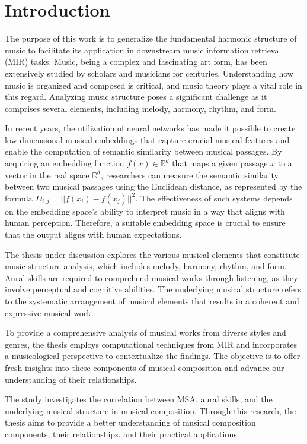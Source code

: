 \chapter{Introduction}

The purpose of this work is to generalize the fundamental harmonic structure of music to facilitate its application in downstream music information retrieval (MIR) tasks. Music, being a complex and fascinating art form, has been extensively studied by scholars and musicians for centuries. Understanding how music is organized and composed is critical, and music theory plays a vital role in this regard. Analyzing music structure poses a significant challenge as it comprises several elements, including melody, harmony, rhythm, and form.

In recent years, the utilization of neural networks has made it possible to create low-dimensional musical embeddings that capture crucial musical features and enable the computation of semantic similarity between musical passages. By acquiring an embedding function $f(x) \in \mathbb{R}^d$ that maps a given passage $x$ to a vector in the real space $\mathbb{R}^d$, researchers can measure the semantic similarity between two musical passages using the Euclidean distance, as represented by the formula $D_{i,j} = ||f(x_i) - f(x_j)||^2$. The effectiveness of such systems depends on the embedding space's ability to interpret music in a way that aligns with human perception. Therefore, a suitable embedding space is crucial to ensure that the output aligns with human expectations.

The thesis under discussion explores the various musical elements that constitute music structure analysis, which includes melody, harmony, rhythm, and form. Aural skills are required to comprehend musical works through listening, as they involve perceptual and cognitive abilities. The underlying musical structure refers to the systematic arrangement of musical elements that results in a coherent and expressive musical work.

To provide a comprehensive analysis of musical works from diverse styles and genres, the thesis employs computational techniques from MIR and incorporates a musicological perspective to contextualize the findings. The objective is to offer fresh insights into these components of musical composition and advance our understanding of their relationships.

The study investigates the correlation between MSA, aural skills, and the underlying musical structure in musical composition. Through this research, the thesis aims to provide a better understanding of musical composition components, their relationships, and their practical applications. 
